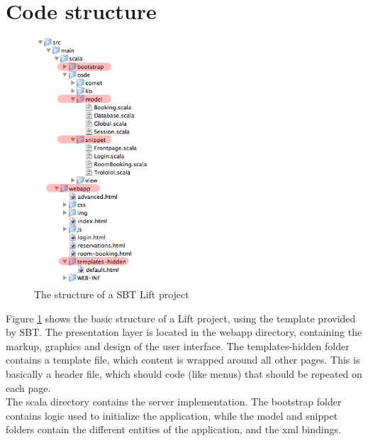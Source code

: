 \pagebreak
\section{Code structure}
\label{app:lift_structure}
\begin{figure}[htb]
\begin{center}
\leavevmode
\includegraphics[width=0.4\textwidth]{images/code_structure}
\end{center}
\caption{The structure of a SBT Lift project}
\label{fig:code_structure}
\end{figure}

Figure \ref{fig:code_structure} shows the basic structure of a Lift project, using the template provided by SBT. The presentation layer is located in the webapp directory, containing the markup, graphics and design of the user interface. The templates-hidden folder contains a template file, which content is wrapped around all other pages. This is basically a header file, which should code (like menus) that should be repeated on each page.\\

The scala directory contains the server implementation. The bootstrap folder contains logic used to initialize the application, while the model and snippet folders contain the different entities of the application, and the xml bindings.